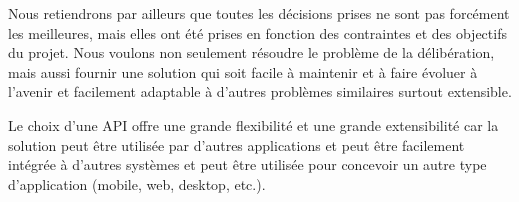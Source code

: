 Nous retiendrons par ailleurs que toutes les décisions prises ne sont pas
forcément les meilleures, mais elles ont été prises en fonction des
contraintes et des objectifs du projet.
Nous voulons non seulement résoudre le problème de la délibération, mais
aussi fournir une solution qui soit facile à maintenir et à faire évoluer à
l'avenir et facilement adaptable à d'autres problèmes similaires surtout extensible.

Le choix d'une API offre une grande flexibilité et une grande extensibilité
car la solution peut être utilisée par d'autres applications et peut être
facilement intégrée à d'autres systèmes et peut être utilisée pour concevoir
un autre type d'application (mobile, web, desktop, etc.).
